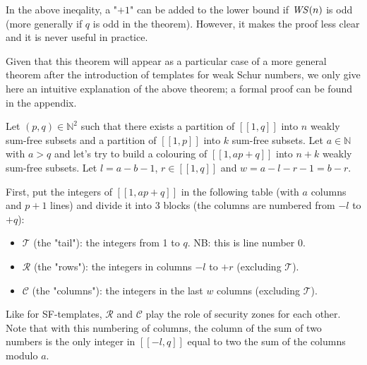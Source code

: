 \begin{remark}
In the above ineqality, a "\(+1\)" can be added to the lower bound if \(\mathit{WS} (n)\) is odd (more generally if \(q\) is
odd in the theorem). However, it makes the proof less clear and it is never useful in practice.
\end{remark}

Given that this theorem will appear as a particular case of a more general theorem after the introduction of
templates for weak Schur numbers, we only give here an intuitive explanation of the above theorem; a formal
proof can be found in the appendix.

Let \((p, q) \in \mathbb{N}^2\) such that there exists a partition of \([\![1,q]\!]\) into \(n\) weakly sum-free
subsets and a partition of \([\![1,p]\!]\) into \(k\) sum-free subsets. Let \(a \in \mathbb{N}\) with \(a > q\)
and let's try to build a colouring of \([\![1, ap + q]\!]\) into \(n + k\) weakly sum-free subsets. Let
\(l = a - b - 1\), \(r \in [\![1,q]\!]\) and \(w = a - l - r - 1 = b - r\).

First, put the integers of \([\![1, ap + q]\!]\) in the following table (with \(a\) columns and \(p + 1\) lines) and divide it into 3 blocks (the columns are numbered from \(-l\) to \(+q\)):

\begin{itemize}
	\item \(\mathcal{T}\) (the "tail"): the integers from 1 to \(q\). NB: this is line number 0.
	\item \(\mathcal{R}\) (the "rows"): the integers in columns \(-l\) to \(+r\) (excluding  \(\mathcal{T}\)).
	\item \(\mathcal{C}\) (the "columns"): the integers in the last \(w\) columns (excluding  \(\mathcal{T}\)).
\end{itemize}

Like for SF-templates, \(\mathcal{R}\) and \(\mathcal{C}\) play the role of security zones for each other. Note that with
this numbering of columns, the column of the sum of two numbers is the only integer in \([\![-l,q]\!]\) equal to two the
sum of the columns modulo \(a\).


